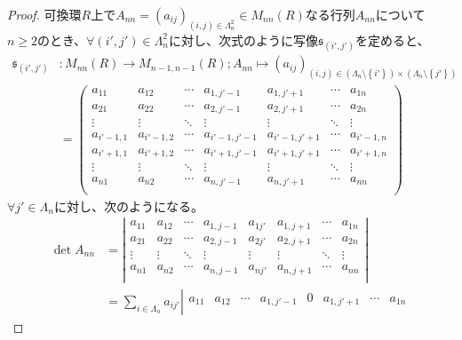 \documentclass[dvipdfmx]{jsarticle}
\begin{document}
\begin{proof}
可換環$R$上で$A_{nn} = \left( a_{ij} \right)_{(i,j) \in \varLambda_{n}^{2}} \in M_{nn}(R)$なる行列$A_{nn}$について$n \geq 2$のとき、$\forall\left( i',j' \right) \in \varLambda_{n}^{2}$に対し、次式のように写像$\mathfrak{s}_{\left( i',j' \right)}$を定めると、
\begin{align*}
\mathfrak{s}_{\left( i',j' \right)}&:M_{nn}(R) \rightarrow M_{n - 1,n - 1}(R);A_{nn} \mapsto \left( a_{ij} \right)_{(i,j) \in \left( \varLambda_{n} \setminus \left\{ i' \right\} \right) \times \left( \varLambda_{n} \setminus \left\{ j' \right\} \right)} \\
&= \begin{pmatrix}
a_{11} & a_{12} & \cdots & a_{1,j' - 1} & a_{1,j' + 1} & \cdots & a_{1n} \\
a_{21} & a_{22} & \cdots & a_{2,j' - 1} & a_{2,j' + 1} & \cdots & a_{2n} \\
 \vdots & \vdots & \ddots & \vdots & \vdots & \ddots & \vdots \\
a_{i' - 1,1} & a_{i' - 1,2} & \cdots & a_{i' - 1,j' - 1} & a_{i' - 1,j' + 1} & \cdots & a_{i' - 1,n} \\
a_{i' + 1,1} & a_{i' + 1,2} & \cdots & a_{i' + 1,j' - 1} & a_{i' + 1,j' + 1} & \cdots & a_{i' + 1,n} \\
 \vdots & \vdots & \ddots & \vdots & \vdots & \ddots & \vdots \\
a_{n1} & a_{n2} & \cdots & a_{n,j' - 1} & a_{n,j' + 1} & \cdots & a_{nn} \\
\end{pmatrix}
\end{align*}
$\forall j' \in \varLambda_{n}$に対し、次のようになる。
\begin{align*}
\det A_{nn} &= \left| \begin{matrix}
a_{11} & a_{12} & \cdots & a_{1,j - 1} & a_{1j'} & a_{1,j + 1} & \cdots & a_{1n} \\
a_{21} & a_{22} & \cdots & a_{2,j - 1} & a_{2j'} & a_{2,j + 1} & \cdots & a_{2n} \\
 \vdots & \vdots & \ddots & \vdots & \vdots & \vdots & \ddots & \vdots \\
a_{n1} & a_{n2} & \cdots & a_{n,j - 1} & a_{nj'} & a_{n,j + 1} & \cdots & a_{nn} \\
\end{matrix} \right|\\
&= \sum_{i \in \varLambda_{n}} {a_{ij'}\left| \begin{matrix}
a_{11} & a_{12} & \cdots & a_{1,j' - 1} & 0 & a_{1,j' + 1} & \cdots & a_{1n} \\

\end{matrix}}
\end{align*}
\end{proof}
\end{document}
